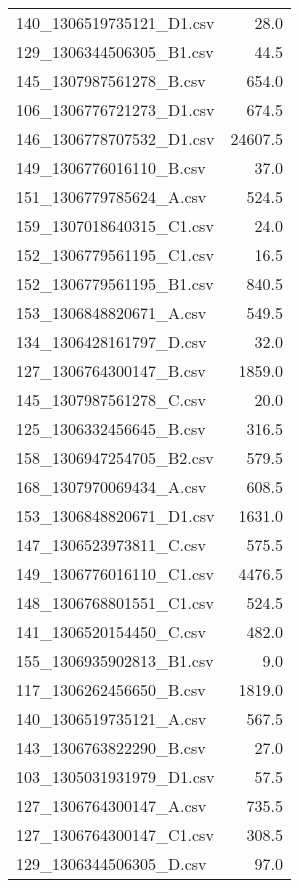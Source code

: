 \documentclass[conference]{IEEEtran}
\begin{document}
\begin{itemize}
\begin{itemize}
\begin{table}
\begin{tabular}{l | r }
	140\_{}1306519735121\_{}D1.csv & 28.0 \\
	129\_{}1306344506305\_{}B1.csv & 44.5 \\
	145\_{}1307987561278\_{}B.csv & 654.0 \\
	106\_{}1306776721273\_{}D1.csv & 674.5 \\
	146\_{}1306778707532\_{}D1.csv & 24607.5 \\
	149\_{}1306776016110\_{}B.csv & 37.0 \\
	151\_{}1306779785624\_{}A.csv & 524.5 \\
	159\_{}1307018640315\_{}C1.csv & 24.0 \\
	152\_{}1306779561195\_{}C1.csv & 16.5 \\
	152\_{}1306779561195\_{}B1.csv & 840.5 \\
	153\_{}1306848820671\_{}A.csv & 549.5 \\
	134\_{}1306428161797\_{}D.csv & 32.0 \\
	127\_{}1306764300147\_{}B.csv & 1859.0 \\
	145\_{}1307987561278\_{}C.csv & 20.0 \\
	125\_{}1306332456645\_{}B.csv & 316.5 \\
	158\_{}1306947254705\_{}B2.csv & 579.5 \\
	168\_{}1307970069434\_{}A.csv & 608.5 \\
	153\_{}1306848820671\_{}D1.csv & 1631.0 \\
	147\_{}1306523973811\_{}C.csv & 575.5 \\
	149\_{}1306776016110\_{}C1.csv & 4476.5 \\
	148\_{}1306768801551\_{}C1.csv & 524.5 \\
	141\_{}1306520154450\_{}C.csv & 482.0 \\
	155\_{}1306935902813\_{}B1.csv & 9.0 \\
	117\_{}1306262456650\_{}B.csv & 1819.0 \\
	140\_{}1306519735121\_{}A.csv & 567.5 \\
	143\_{}1306763822290\_{}B.csv & 27.0 \\
	103\_{}1305031931979\_{}D1.csv & 57.5 \\
	127\_{}1306764300147\_{}A.csv & 735.5 \\
	127\_{}1306764300147\_{}C1.csv & 308.5 \\
	129\_{}1306344506305\_{}D.csv & 97.0 \\

\end{tabular}
\end{table}


\end{itemize}
\end{itemize}
\end{document}
